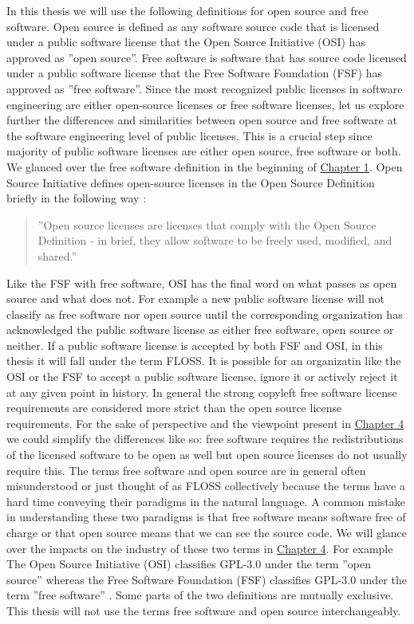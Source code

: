 In this thesis we will use the following definitions for open source and free software. Open source is defined as any software source code that is licensed under a public software license that the Open Source Initiative (OSI) has approved as ''open source''. Free software is software that has source code licensed under a public software license that the Free Software Foundation (FSF) has approved as ''free software''. Since the most recognized public licenses in software engineering are either open-source licenses or free software licenses, let us explore further the differences and similarities between open source and free software at the software engineering level of public licenses. This is a crucial step since majority of public software licenses are either open source, free software or both. We glanced over the free software definition in the beginning of \hyperref[intro]{Chapter 1}. Open Source Initiative defines open-source licenses in the Open Source Definition briefly in the following way \citep{osi:licenselist}:
\begin{quote}
	''Open source licenses are licenses that comply with the Open Source Definition - in brief, they allow software to be freely used, modified, and shared.''
\end{quote}
Like the FSF with free software, OSI has the final word on what passes as open source and what does not. For example a new public software license will not classify as free software nor open source until the corresponding organization has acknowledged the public software license as either free software, open source or neither. If a public software license is accepted by both FSF and OSI, in this thesis it will fall under the term FLOSS. It is possible for an organizatin like the OSI or the FSF to accept a public software license, ignore it or actively reject it at any given point in history. In general the strong copyleft free software license requirements are considered more strict than the open source license requirements. For the sake of perspective and the viewpoint present in \hyperref[discussion]{Chapter 4} we could simplify the differences like so: free software requires the redistributions of the licensed software to be open as well but open source licenses do not usually require this. The terms free software and open source are in general often misunderstood or just thought of as FLOSS collectively because the terms have a hard time conveying their paradigms in the natural language. A common mistake in understanding these two paradigms is that free software means software free of charge or that open source means that we can see the source code. We will glance over the impacts on the industry of these two terms in \hyperref[discussion]{Chapter 4}. For example The Open Source Initiative (OSI) classifies GPL-3.0 under the term ''open source'' whereas the Free Software Foundation (FSF) classifies GPL-3.0 under the term ''free software'' \citep{osi:gplv3}\citep{rms:opensource}. Some parts of the two definitions are mutually exclusive. This thesis will not use the terms free software and open source interchangeably.

